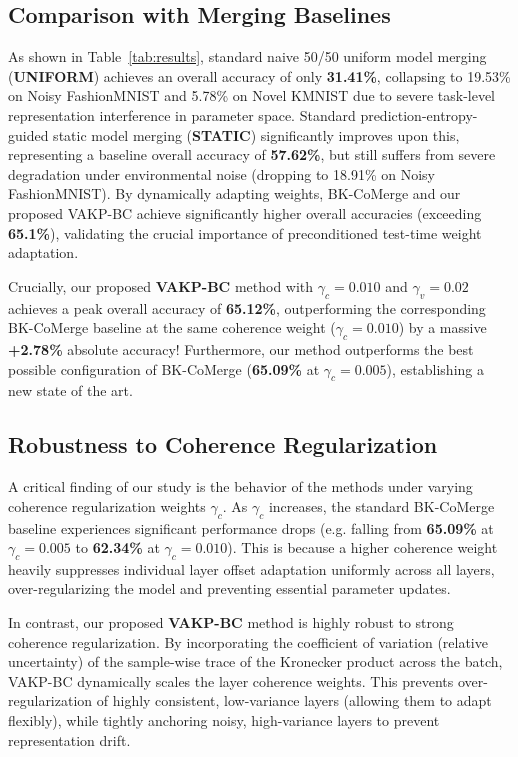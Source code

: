 \documentclass{article}
\theoremstyle{plain}
\theoremstyle{definition}
\theoremstyle{remark}
\begin{document}
\subsection{Comparison with Merging Baselines}
As shown in Table~\ref{tab:results}, standard naive 50/50 uniform model merging (\textbf{UNIFORM}) achieves an overall accuracy of only \textbf{31.41\%}, collapsing to 19.53\% on Noisy FashionMNIST and 5.78\% on Novel KMNIST due to severe task-level representation interference in parameter space. Standard prediction-entropy-guided static model merging (\textbf{STATIC}) significantly improves upon this, representing a baseline overall accuracy of \textbf{57.62\%}, but still suffers from severe degradation under environmental noise (dropping to 18.91\% on Noisy FashionMNIST). By dynamically adapting weights, BK-CoMerge and our proposed VAKP-BC achieve significantly higher overall accuracies (exceeding \textbf{65.1\%}), validating the crucial importance of preconditioned test-time weight adaptation.

Crucially, our proposed \textbf{VAKP-BC} method with $\gamma_c=0.010$ and $\gamma_v=0.02$ achieves a peak overall accuracy of \textbf{65.12\%}, outperforming the corresponding BK-CoMerge baseline at the same coherence weight ($\gamma_c=0.010$) by a massive \textbf{+2.78\%} absolute accuracy! Furthermore, our method outperforms the best possible configuration of BK-CoMerge (\textbf{65.09\%} at $\gamma_c=0.005$), establishing a new state of the art.

\subsection{Robustness to Coherence Regularization}
A critical finding of our study is the behavior of the methods under varying coherence regularization weights $\gamma_c$. As $\gamma_c$ increases, the standard BK-CoMerge baseline experiences significant performance drops (e.g. falling from \textbf{65.09\%} at $\gamma_c=0.005$ to \textbf{62.34\%} at $\gamma_c=0.010$). This is because a higher coherence weight heavily suppresses individual layer offset adaptation uniformly across all layers, over-regularizing the model and preventing essential parameter updates.

In contrast, our proposed \textbf{VAKP-BC} method is highly robust to strong coherence regularization. By incorporating the coefficient of variation (relative uncertainty) of the sample-wise trace of the Kronecker product across the batch, VAKP-BC dynamically scales the layer coherence weights. This prevents over-regularization of highly consistent, low-variance layers (allowing them to adapt flexibly), while tightly anchoring noisy, high-variance layers to prevent representation drift.
\end{document}
